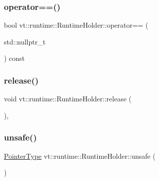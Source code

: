 \subsubsection{\texorpdfstring{operator==()}{operator==()}\hspace{0.1cm}{\footnotesize\ttfamily [2/2]}}
{\footnotesize\ttfamily bool vt\+::runtime\+::\+Runtime\+Holder\+::operator== (\begin{DoxyParamCaption}\item[{std\+::nullptr\+\_\+t}]{ }\end{DoxyParamCaption}) const\hspace{0.3cm}{\ttfamily [inline]}}

\mbox{\label{structvt_1_1runtime_1_1_runtime_holder_a6a56c670252718c1533acafe6aa6a2c5}} 
\subsubsection{\texorpdfstring{release()}{release()}}
{\footnotesize\ttfamily void vt\+::runtime\+::\+Runtime\+Holder\+::release (\begin{DoxyParamCaption}{ }\end{DoxyParamCaption})\hspace{0.3cm}{\ttfamily [inline]}, {\ttfamily [private]}}

\mbox{\label{structvt_1_1runtime_1_1_runtime_holder_aacba0762fe099fb04faa1fb308c7782b}} 
\subsubsection{\texorpdfstring{unsafe()}{unsafe()}}
{\footnotesize\ttfamily \hyperlink{structvt_1_1runtime_1_1_runtime_holder_a9740e8aa7487fcf38b67a7e160d7b046}{Pointer\+Type} vt\+::runtime\+::\+Runtime\+Holder\+::unsafe (\begin{DoxyParamCaption}{ }\end{DoxyParamCaption})\hspace{0.3cm}{\ttfamily [inline]}}



